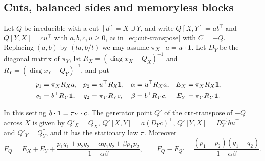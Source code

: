 \subsection{Cuts, balanced sides and memoryless blocks}\label{sec:law-cuts}

Let $Q$ be irreducible with a cut $[d]=X\cup Y$, and write $Q[X,Y]=ab^\top$ and $Q[Y,X]=cu^\top$
with $a,b,c,u\ge0$, as in~\eqref{eq:cut-transpose} with $C=-Q$. Replacing $(a,b)$ by $(ta,b/t)$
we may assume $\pi_X\cdot a=u\cdot\mathbf{1}$. Let $D_Y$ be the diagonal matrix of $\pi_Y$, let
$R_X=(\operatorname{diag}x_X-Q_X)^{-1}$ and $R_Y=(\operatorname{diag}x_Y-Q_Y)^{-1}$, and put
\[
\begin{aligned}
 p_1&=\pi_XR_Xa, & p_2&=u^\top R_X\mathbf{1}, & \alpha&=u^\top R_Xa, & E_X&=\pi_XR_X\mathbf{1},\\
 q_1&=b^\top R_Y\mathbf{1}, & q_2&=\pi_YR_Yc, & \beta&=b^\top R_Yc, & E_Y&=\pi_YR_Y\mathbf{1} .
\end{aligned}
\]

\begin{proposition}\label{prop:gluing}
In this setting $b\cdot\mathbf{1}=\pi_Y\cdot c$. The generator point $Q'$ of the cut-transpose of $-Q$
across $X$ is given by $Q'_X=Q_X$, $Q'[X,Y]=a(D_Yc)^\top$, $Q'[Y,X]=D_Y^{-1}bu^\top$ and
$Q'_Y=Q^*_Y$, and it has the stationary law $\pi$. Moreover
\[
 F_Q=E_X+E_Y+\frac{p_1q_1+p_2q_2+\alpha q_1q_2+\beta p_1p_2}{1-\alpha\beta},\qquad
 F_Q-F_{Q'}=\frac{(p_1-p_2)(q_1-q_2)}{1-\alpha\beta}.
\]
\end{proposition}

